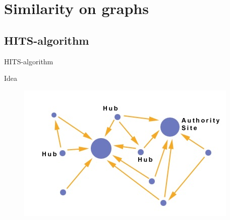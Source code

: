 \documentclass{beamer}
\begin{document}
\section{Similarity on graphs}
\subsection{HITS-algorithm}
\begin{frame}{HITS-algorithm}
\begin{block}{Idea}
\begin{figure}
  \centering
  \includegraphics[scale=0.5]{hitsq.jpg}\\
\end{figure}
\end{block}

\end{frame}
\end{document}
